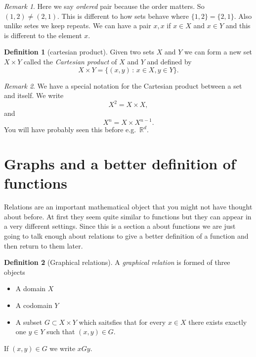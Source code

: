\documentclass[
]{book}
\theoremstyle{definition}
\newtheorem{definition}{Definition}[chapter]
\theoremstyle{definition}
\theoremstyle{definition}
\theoremstyle{definition}
\theoremstyle{remark}
\newtheorem*{remark}{Remark}
\begin{document}
\begin{remark}
Here we say \emph{ordered} pair because the order matters. So \((1,2) \neq (2,1)\). This is different to how sets behave where \(\{1,2\} = \{2,1\}\). Also unlike setes we keep repeats. We can have a pair \(x,x\) if \(x \in X\) and \(x \in Y\) and this is different to the element \(x\).
\end{remark}

\begin{definition}[cartesian product]
Given two sets \(X\) and \(Y\) we can form a new set \(X \times Y\) called the \emph{Cartesian product} of \(X\) and \(Y\) and defined by
\[ X \times Y = \{ (x,y) \,:\, x \in X, y \in Y\}.  \]
\end{definition}

\begin{remark}
We have a special notation for the Cartesian product between a set and itself. We write
\[ X^2 = X \times X,  \] and
\[ X^n = X \times X^{n-1}.  \] You will have probably seen this before e.g.~\(\mathbb{R}^d\).
\end{remark}

\section{Graphs and a better definition of functions}\label{graphs-and-a-better-definition-of-functions}

Relations are an important mathematical object that you might not have thought about before. At first they seem quite similar to functions but they can appear in a very different settings. Since this is a section a about functions we are just going to talk enough about relations to give a better definition of a function and then return to them later.

\begin{definition}[Graphical relations]
A \emph{graphical relation} is formed of three objects

\begin{itemize}
\item
  A domain \(X\)
\item
  A codomain \(Y\)
\item
  A subset \(G \subset X \times Y\) which saitsfies that for every \(x \in X\) there exists exactly one \(y \in Y\) such that \((x,y) \in G\).
\end{itemize}

If \((x,y) \in G\) we write \(xGy\).
\end{definition}
\end{document}
